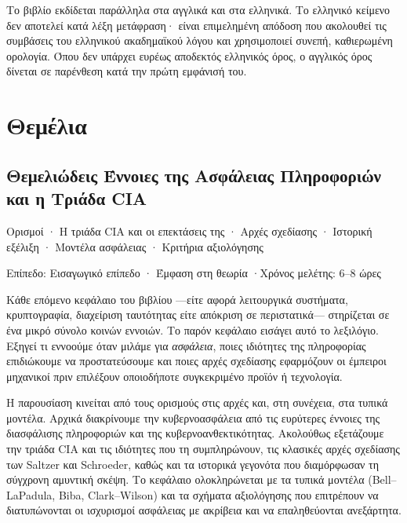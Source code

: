 \documentclass[11pt,openany]{book}
\newcommand{\chaptermeta}[3]{%
  {\sffamily\small\color{accent}#1\par}\vspace{0.3em}
  {\sffamily\footnotesize\color{gray}#2 \quad·\quad #3\par}\vspace{1.2em}}
\begin{document}
Το βιβλίο εκδίδεται παράλληλα στα αγγλικά και στα ελληνικά. Το ελληνικό κείμενο δεν αποτελεί κατά λέξη μετάφραση· είναι επιμελημένη απόδοση που ακολουθεί τις συμβάσεις του ελληνικού ακαδημαϊκού λόγου και χρησιμοποιεί συνεπή, καθιερωμένη ορολογία. Όπου δεν υπάρχει ευρέως αποδεκτός ελληνικός όρος, ο αγγλικός όρος δίνεται σε παρένθεση κατά την πρώτη εμφάνισή του.


\mainmatter
\part{Θεμέλια}
\chapter{Θεμελιώδεις Έννοιες της Ασφάλειας Πληροφοριών και η Τριάδα CIA}\label{ch:1}
\chaptermeta{Ορισμοί · Η τριάδα CIA και οι επεκτάσεις της · Αρχές σχεδίασης · Ιστορική εξέλιξη · Μοντέλα ασφάλειας · Κριτήρια αξιολόγησης}{Επίπεδο: Εισαγωγικό επίπεδο · Έμφαση στη θεωρία}{Χρόνος μελέτης: 6–8 ώρες}

Κάθε επόμενο κεφάλαιο του βιβλίου —είτε αφορά λειτουργικά συστήματα, κρυπτογραφία, διαχείριση ταυτότητας είτε απόκριση σε περιστατικά— στηρίζεται σε ένα μικρό σύνολο κοινών εννοιών. Το παρόν κεφάλαιο εισάγει αυτό το λεξιλόγιο. Εξηγεί τι εννοούμε όταν μιλάμε για \emph{ασφάλεια}, ποιες ιδιότητες της πληροφορίας επιδιώκουμε να προστατεύσουμε και ποιες αρχές σχεδίασης εφαρμόζουν οι έμπειροι μηχανικοί πριν επιλέξουν οποιοδήποτε συγκεκριμένο προϊόν ή τεχνολογία.

Η παρουσίαση κινείται από τους ορισμούς στις αρχές και, στη συνέχεια, στα τυπικά μοντέλα. Αρχικά διακρίνουμε την κυβερνοασφάλεια από τις ευρύτερες έννοιες της διασφάλισης πληροφοριών και της κυβερνοανθεκτικότητας. Ακολούθως εξετάζουμε την τριάδα CIA και τις ιδιότητες που τη συμπληρώνουν, τις κλασικές αρχές σχεδίασης των Saltzer και Schroeder, καθώς και τα ιστορικά γεγονότα που διαμόρφωσαν τη σύγχρονη αμυντική σκέψη. Το κεφάλαιο ολοκληρώνεται με τα τυπικά μοντέλα (Bell–LaPadula, Biba, Clark–Wilson) και τα σχήματα αξιολόγησης που επιτρέπουν να διατυπώνονται οι ισχυρισμοί ασφάλειας με ακρίβεια και να επαληθεύονται ανεξάρτητα.
\end{document}
